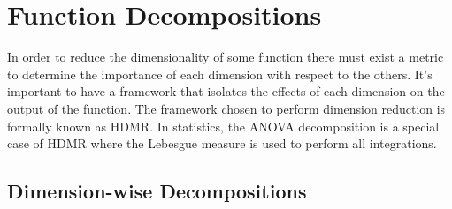 \section{Function Decompositions} \label{sec:func_decomp}

In order to reduce the dimensionality of some function there must exist a metric to determine the importance of each dimension with respect to the others. It's important to have a framework that isolates the effects of each dimension on the output of the function. The framework chosen to perform dimension reduction is formally known as \ac{HDMR}. In statistics, the \ac{ANOVA} decomposition is a special case of \ac{HDMR} where the Lebesgue measure is used to perform all integrations.

\subsection{Dimension-wise Decompositions} \label{subsec:dim_wise_decomps}

